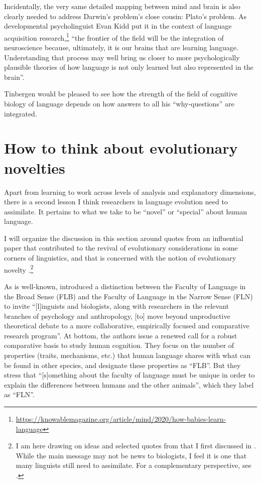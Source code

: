 Incidentally, the very same detailed mapping between mind and brain is also clearly needed to address Darwin's problem's close cousin: Plato's problem. As developmental psycholinguist Evan Kidd put it in the context of language acquisition research,\footnote{\url{https://knowablemagazine.org/article/mind/2020/how-babies-learn-language}} ``the frontier of the field will be the integration of neuroscience because, ultimately, it is our brains that are learning language. Understanding that process may well bring us closer to more psychologically plausible theories of how language is not only learned but also represented in the brain''.

Tinbergen would be pleased to see how the strength of the field of cognitive biology of language depends on how answers to all his ``why-questions'' are integrated.

\section{How to think about evolutionary novelties}

Apart from learning to work across levels of analysis and explanatory dimensions, there is a second lesson I think researchers in language evolution need to assimilate. It pertains to what we take to be ``novel'' or ``special'' about human language.

I will organize the discussion in this section around quotes from an influential paper that contributed to the revival of evolutionary considerations in some corners of linguistics, and that is concerned with the notion of evolutionary novelty \citep{hauser2002faculty}.\footnote{I am here drawing on ideas and selected quotes from \cite{hauser2002faculty} that I first discussed in \cite{boeckx2013biolinguistics}. While the main message may not be news to biologists, I feel it is one that many linguists still need to assimilate. For a complementary perspective, see \cite{fujita2016certain}.}

As is well-known, \cite{hauser2002faculty} introduced a distinction between the Faculty of Language in the Broad Sense (FLB) and the Faculty of Language in the Narrow Sense (FLN) to invite ``[l]inguists and biologists, along with researchers in the relevant branches of psychology and anthropology, [to] move beyond unproductive theoretical debate to a more collaborative, empirically focused and comparative research program''. At bottom, the authors issue a renewed call for a robust comparative basis to study human cognition. They focus on the number of properties (traits, mechanisms, etc.) that human language shares with what can be found in other species, and designate these properties as ``FLB''. But they stress that ``[s]omething about the faculty of language must be unique in order to explain the differences between humans and the other animals'', which they label as ``FLN''.

